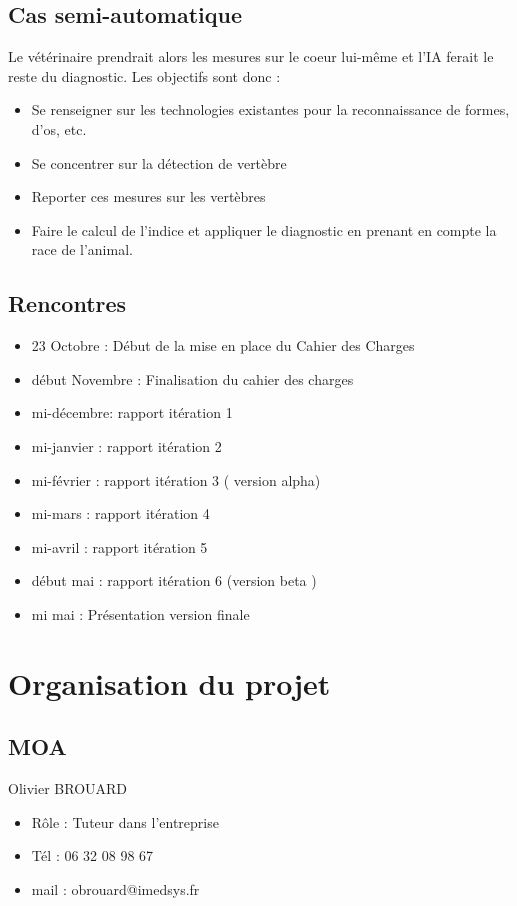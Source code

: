 \documentclass[a4paper, 11pt]{report}
\begin{document}
\subsection*{Cas semi-automatique}
Le vétérinaire prendrait alors les mesures sur le coeur lui-même et l'IA ferait le reste du diagnostic. Les objectifs sont donc :
\begin{itemize}
	\item Se renseigner sur les technologies existantes pour la reconnaissance de formes, d'os, etc.
	\item Se concentrer sur la détection de vertèbre 
	\item Reporter ces mesures sur les vertèbres
	\item Faire le calcul de l'indice et appliquer le diagnostic en prenant en compte la race de l'animal.  
\end{itemize}


\subsection*{Rencontres}
\begin{itemize}
	\item 23 Octobre : Début de la mise en place du Cahier des Charges
	\item début Novembre : Finalisation du cahier des charges
	\item mi-décembre: rapport itération 1
	\item mi-janvier : rapport itération 2
	\item mi-février : rapport itération 3 ( version alpha) 
	\item mi-mars : rapport itération 4
	\item mi-avril : rapport itération 5 
	\item début mai : rapport itération 6 (version beta )
	\item mi mai : Présentation version finale

\end{itemize}

\section*{Organisation du projet}
\subsection*{MOA}	
Olivier BROUARD

\begin{itemize}
\item Rôle : Tuteur dans l'entreprise 
\item Tél : 06 32 08 98 67 
\item mail : obrouard@imedsys.fr
\end{itemize}
\end{document}
